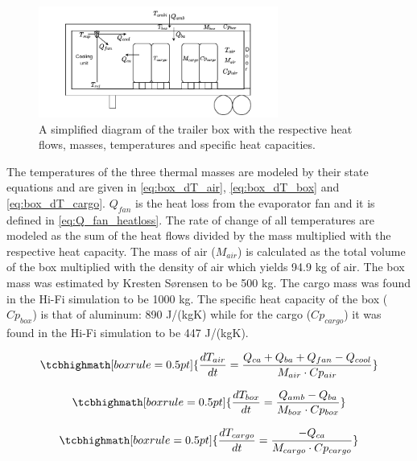\begin{figure}[h!]
	\centering
	\includegraphics[width=0.7\textwidth]{Graphics/Box.pdf}
	\caption{A simplified diagram of the trailer box with the respective heat flows, masses, temperatures and specific heat capacities.}
	\label{fig:box_diagram}
\end{figure}

The temperatures of the three thermal masses are modeled by their state equations and are given in \cref{eq:box_dT_air}, \cref{eq:box_dT_box} and \cref{eq:box_dT_cargo}. $Q_{fan}$ is the heat loss from the evaporator fan and it is defined in \cref{eq:Q_fan_heatloss}. The rate of change of all temperatures are modeled as the sum of the heat flows divided by the mass multiplied with the respective heat capacity. The mass of air ($M_{air}$) is calculated as the total volume of the box multiplied with the density of air which yields 94.9 \si{kg} of air. The box mass was estimated by Kresten Sørensen to be 500 \si{kg}. The cargo mass was found in the Hi-Fi simulation to be 1000 \si{kg}. The specific heat capacity of the box ($Cp_{box}$) is that of aluminum: 890 \si{J}/(\si{kg}\si{K}) while for the cargo ($Cp_{cargo}$) it was found in the Hi-Fi simulation to be 447 \si{J}/(\si{kg}\si{K}).

\begin{equation}
	\tcbhighmath[boxrule = 0.5pt]{\frac{dT_{air}}{dt} = \frac{Q_{ca} + Q_{ba} + Q_{fan} -Q_{cool}}{M_{air} \cdot Cp_{air}}} \label{eq:box_dT_air}
\end{equation}

\begin{equation}
	\tcbhighmath[boxrule = 0.5pt]{\frac{dT_{box}}{dt} = \frac{Q_{amb} - Q_{ba}}{M_{box} \cdot Cp_{box}}} \label{eq:box_dT_box}
\end{equation}

\begin{equation} 
	\tcbhighmath[boxrule = 0.5pt]{\frac{dT_{cargo}}{dt} = \frac{-Q_{ca}}{M_{cargo} \cdot Cp_{cargo}}} \label{eq:box_dT_cargo}
\end{equation}


